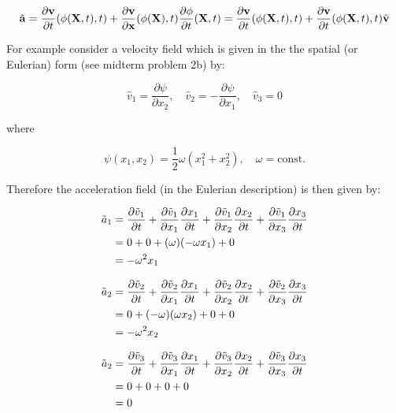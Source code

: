 \documentclass[a4paper]{article}
\begin{document}
 \begin{equation}
     \Tilde{\mathbf{a}} = \frac{\partial \mathbf{v}}{\partial t}(\phi(\mathbf{X},t),t) + \frac{\partial \mathbf{v}}{\partial \mathbf{x}}(\phi(\mathbf{X}),t) \frac{\partial \phi}{\partial t}(\mathbf{X},t) = \frac{\partial \mathbf{v}}{\partial t}(\phi(\mathbf{X},t),t) + \frac{\partial \mathbf{v}}{\partial t}(\phi(\mathbf{X},t),t) \hat{\mathbf{v}}
 \end{equation}
 
 For example consider a velocity field which is given in the the spatial (or Eulerian) form (see midterm problem 2b) by: 

\begin{equation}
    \hat{v}_1 = \frac{\partial \psi}{\partial x_2}, \quad \hat{v}_2 = -\frac{\partial \psi}{\partial x_1}, \quad \hat{v}_3 = 0
\end{equation}

where 

\begin{equation}
    \psi(x_1, x_2) = \frac{1}{2}\omega(x_1^2 + x_2^2), \quad \omega = \text{const}. 
\end{equation}
 
 Therefore the acceleration field (in the Eulerian description) is then given by:
 
\begin{align}
    \Tilde{a}_1 &= \frac{\partial \Tilde{v}_1}{\partial t} + \frac{\partial \Tilde{v}_1}{\partial x_1} \frac{\partial x_1}{\partial t} + \frac{\partial \Tilde{v}_1}{\partial x_2} \frac{\partial x_2}{\partial t} + \frac{\partial \Tilde{v}_1}{\partial x_3} \frac{\partial x_3}{\partial t} \\
                &= 0 + 0 + (\omega)(-\omega x_1) + 0 \\
                &= -\omega^2 x_1
\end{align}

\begin{align}
    \Tilde{a}_2 &= \frac{\partial \Tilde{v}_2}{\partial t} + \frac{\partial \Tilde{v}_2}{\partial x_1} \frac{\partial x_1}{\partial t} + \frac{\partial \Tilde{v}_2}{\partial x_2} \frac{\partial x_2}{\partial t} + \frac{\partial \Tilde{v}_2}{\partial x_3} \frac{\partial x_3}{\partial t} \\
                &= 0 + (-\omega)(\omega x_2) + 0 + 0 \\
                &= -\omega^2 x_2
\end{align}

\begin{align}
    \Tilde{a}_2 &= \frac{\partial \Tilde{v}_3}{\partial t} + \frac{\partial \Tilde{v}_3}{\partial x_1} \frac{\partial x_1}{\partial t} + \frac{\partial \Tilde{v}_3}{\partial x_2} \frac{\partial x_2}{\partial t} + \frac{\partial \Tilde{v}_3}{\partial x_3} \frac{\partial x_3}{\partial t} \\
                &= 0 + 0 + 0 + 0 \\
                &= 0
\end{align}
\end{document}
